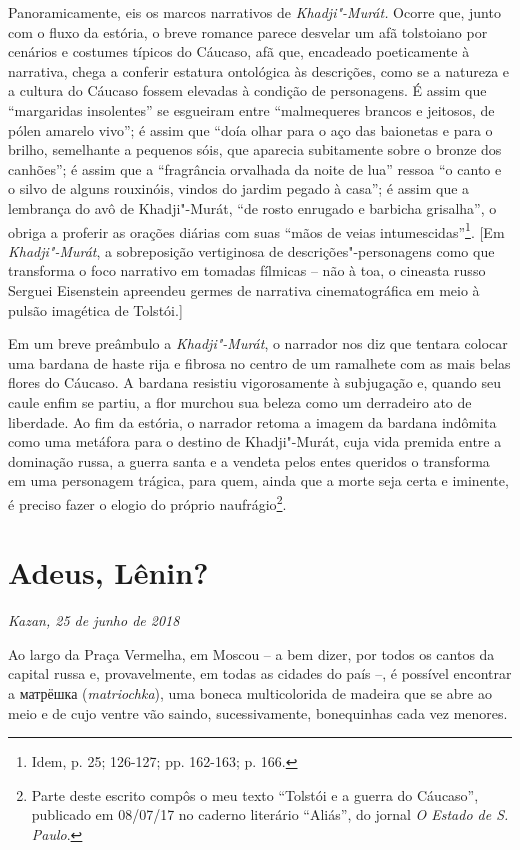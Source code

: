 Panoramicamente, eis os marcos narrativos de \emph{Khadji"-Murát.} Ocorre
que, junto com o fluxo da estória, o breve romance parece desvelar um
afã tolstoiano por cenários e costumes típicos do Cáucaso, afã que,
encadeado poeticamente à narrativa, chega a conferir estatura ontológica
às descrições, como se a natureza e a cultura do Cáucaso fossem elevadas
à condição de personagens. É assim que ``margaridas insolentes'' se
esgueiram entre ``malmequeres brancos e jeitosos, de pólen amarelo
vivo''; é assim que ``doía olhar para o aço das baionetas e para o
brilho, semelhante a pequenos sóis, que aparecia subitamente sobre o
bronze dos canhões''; é assim que a ``fragrância orvalhada da noite de
lua'' ressoa ``o canto e o silvo de alguns rouxinóis, vindos do jardim
pegado à casa''; é assim que a lembrança do avô de Khadji"-Murát, ``de
rosto enrugado e barbicha grisalha'', o obriga a proferir as orações
diárias com suas ``mãos de veias intumescidas''\footnote{Idem, p. 25;
  126-127; pp. 162-163; p. 166.}. {[}Em \emph{Khadji"-Murát}, a
sobreposição vertiginosa de descrições"-personagens como que transforma o
foco narrativo em tomadas fílmicas -- não à toa, o cineasta russo
Serguei Eisenstein apreendeu germes de narrativa cinematográfica em meio
à pulsão imagética de Tolstói.{]}

Em um breve preâmbulo a \emph{Khadji"-Murát}, o narrador nos diz que
tentara colocar uma bardana de haste rija e fibrosa no centro de um
ramalhete com as mais belas flores do Cáucaso. A bardana resistiu
vigorosamente à subjugação e, quando seu caule enfim se partiu, a flor
murchou sua beleza como um derradeiro ato de liberdade. Ao fim da
estória, o narrador retoma a imagem da bardana indômita como uma
metáfora para o destino de Khadji"-Murát, cuja vida premida entre a
dominação russa, a guerra santa e a vendeta pelos entes queridos o
transforma em uma personagem trágica, para quem, ainda que a morte seja
certa e iminente, é preciso fazer o elogio do próprio
naufrágio\footnote{Parte deste escrito compôs o meu texto ``Tolstói e a
  guerra do Cáucaso'', publicado em 08/07/17 no caderno literário
  ``Aliás'', do jornal \emph{O Estado de S. Paulo}.}.

\chapter*{Adeus, Lênin?}

\begin{flushright}
\emph{Kazan, 25 de junho de 2018}
\end{flushright}
Ao largo da Praça Vermelha, em Moscou -- a bem dizer, por todos os
cantos da capital russa e, provavelmente, em todas as cidades do país
--, é possível encontrar a матрёшка (\emph{matriochka}), uma boneca
multicolorida de madeira que se abre ao meio e de cujo ventre vão
saindo, sucessivamente, bonequinhas cada vez menores.

